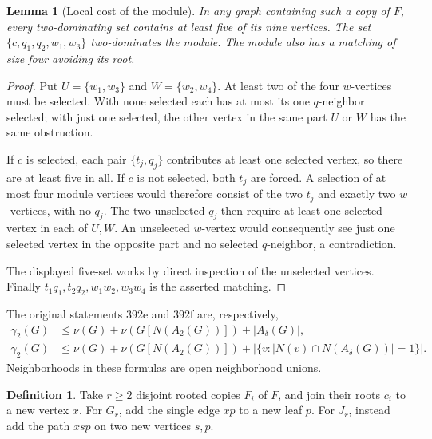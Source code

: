 \documentclass[11pt,a4paper]{article}
\newtheorem{lemma}[theorem]{Lemma}
\theoremstyle{definition}\newtheorem{definition}[theorem]{Definition}
\theoremstyle{remark}\newtheorem{remark}[theorem]{Remark}
\begin{document}
\begin{lemma}[Local cost of the module]
\label{early:lem:nine-module}
In any graph containing such a copy of $F$, every two-dominating set
contains at least five of its nine vertices.  The set
$\{c,q_1,q_2,w_1,w_3\}$ two-dominates the module.  The module also has
a matching of size four avoiding its root.
\end{lemma}
\begin{proof}
Put $U=\{w_1,w_3\}$ and $W=\{w_2,w_4\}$.  At least two of the four
$w$-vertices must be selected.  With none selected each has at most its
one $q$-neighbor selected; with just one selected, the other vertex in
the same part $U$ or $W$ has the same obstruction.

If $c$ is selected, each pair $\{t_j,q_j\}$ contributes at least one
selected vertex, so there are at least five in all.  If $c$ is not
selected, both $t_j$ are forced.  A selection of at most four module
vertices would therefore consist of the two $t_j$ and exactly two
$w$-vertices, with no $q_j$.  The two unselected $q_j$ then require at
least one selected vertex in each of $U,W$.  An unselected $w$-vertex
would consequently see just one selected vertex in the opposite part
and no selected $q$-neighbor, a contradiction.

The displayed five-set works by direct inspection of the unselected
vertices.  Finally
$t_1q_1,t_2q_2,w_1w_2,w_3w_4$ is the asserted matching.
\end{proof}

The original statements 392e and 392f are, respectively,
\begin{align}
 \gamma_2(G)&\leq \nu(G)+\nu(G[N(A_2(G))])+|A_\delta(G)|,
 \label{early:eq:392e-original}\\
 \gamma_2(G)&\leq \nu(G)+\nu(G[N(A_2(G))])+
 \bigl|\{v:|N(v)\cap N(A_\delta(G))|=1\}\bigr|.
 \label{early:eq:392f-original}
\end{align}
Neighborhoods in these formulas are open neighborhood unions.

\begin{definition}
\label{early:def:392-families}
Take $r\geq2$ disjoint rooted copies $F_i$ of $F$, and join their roots
$c_i$ to a new vertex $x$.  For $G_r$, add the single edge $xp$ to a
new leaf $p$.  For $J_r$, instead add the path $xsp$ on two new
vertices $s,p$.
\end{definition}
\end{document}
